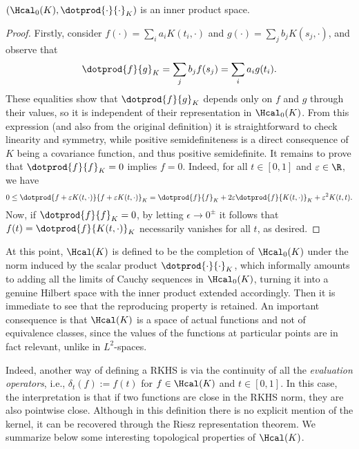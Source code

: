 \begin{proposition} \((\Hcal_0(K), \dotprod{\cdot}{\cdot}_K)\) is an inner product space.
\end{proposition}
  \begin{proof}
    Firstly, consider \(f(\cdot)=\sum_i a_i K(t_i, \cdot) \) and \(g(\cdot)=\sum_j b_j K(s_j, \cdot)\), and observe that
    \[
      \dotprod{f}{g}_K = \sum_j b_j f(s_j) = \sum_i a_i g(t_i).
    \]
    These equalities show that \(\dotprod{f}{g}_K\) depends only on \(f\) and \(g\) through their values, so it is independent of their representation in \(\Hcal_0(K)\). From this expression (and also from the original definition) it is straightforward to check linearity and symmetry, while positive semidefiniteness is a direct consequence of \(K\) being a covariance function, and thus positive semidefinite. It remains to prove that \(\dotprod{f}{f}_K=0\) implies \(f=0\). Indeed, for all \(t\in[0,1]\) and \(\epsilon \in \R\), we have
    \[
    0 \leq \dotprod{f + \epsilon K(t, \cdot)}{f + \epsilon K(t, \cdot)}_K = \dotprod{f}{f}_K + 2\epsilon\dotprod{f}{K(t, \cdot)}_K + \epsilon^2 K(t, t).
    \]
    Now, if \(\dotprod{f}{f}_K=0\), by letting \(\epsilon\to 0^{\pm}\) it follows that \(f(t)=\dotprod{f}{K(t, \cdot)}_K\) necessarily vanishes for all \(t\), as desired.
  \end{proof}

At this point, \(\Hcal(K)\) is defined to be the completion of \(\Hcal_0(K)\) under the norm induced by the scalar product \(\dotprod{\cdot}{\cdot}_K\), which informally amounts to adding all the limits of Cauchy sequences in \(\Hcal_0(K)\), turning it into a genuine Hilbert space with the inner product extended accordingly. Then it is immediate to see that the reproducing property is retained. An important consequence is that \(\Hcal(K)\) is a space of actual functions and not of equivalence classes, since the values of the functions at particular points are in fact relevant, unlike in \(L^2\)-spaces.

Indeed, another way of defining a RKHS is via the continuity of all the \textit{evaluation operators}, i.e., \(\delta_t(f) := f(t)\) for \(f\in\Hcal(K)\) and \(t\in[0,1]\). In this case, the interpretation is that if two functions are close in the RKHS norm, they are also pointwise close. Although in this definition there is no explicit mention of the kernel, it can be recovered through the Riesz representation theorem. We summarize below some interesting topological properties of \(\Hcal(K)\).

